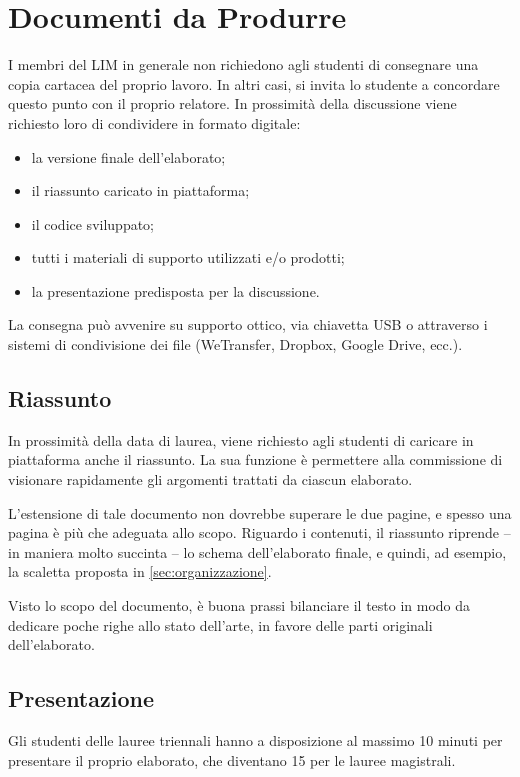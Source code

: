 \documentclass[12pt]{report}
\begin{document}
\chapter{Documenti da Produrre}
I membri del LIM in generale non richiedono agli studenti di consegnare una copia cartacea del proprio lavoro. In altri casi, si invita lo studente a concordare questo punto con il proprio relatore.
In prossimità della discussione viene richiesto loro di condividere in formato digitale:
\begin{itemize}
	\item la versione finale dell'elaborato;
	\item il riassunto caricato in piattaforma;
	\item il codice sviluppato;
	\item tutti i materiali di supporto utilizzati e/o prodotti;
	\item la presentazione predisposta per la discussione.
\end{itemize}

La consegna può avvenire su supporto ottico, via chiavetta USB o attraverso i sistemi di condivisione dei file (WeTransfer, Dropbox, Google Drive, ecc.).

\section{Riassunto}
In prossimità della data di laurea, viene richiesto agli studenti di caricare in piattaforma anche il riassunto. La sua funzione è permettere alla commissione di visionare rapidamente gli argomenti trattati da ciascun elaborato.

L'estensione di tale documento non dovrebbe superare le due pagine, e spesso una pagina è più che adeguata allo scopo. Riguardo i contenuti, il riassunto riprende -- in maniera molto succinta -- lo schema dell'elaborato finale, e quindi, ad esempio, la scaletta proposta in \ref{sec:organizzazione}.

Visto lo scopo del documento, è buona prassi bilanciare il testo in modo da dedicare poche righe allo stato dell'arte, in favore delle parti originali dell'elaborato.

\section{Presentazione}
Gli studenti delle lauree triennali hanno a disposizione al massimo 10 minuti per presentare il proprio elaborato, che diventano 15 per le lauree magistrali. 
\end{document}
